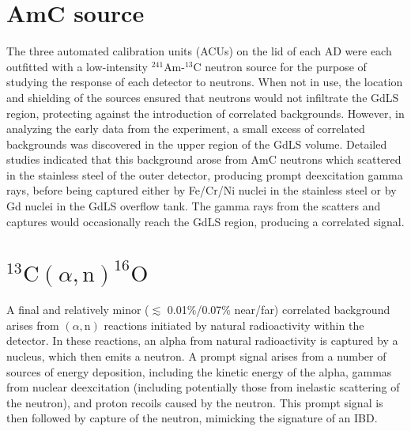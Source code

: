 \documentclass[../thesis.tex]{subfiles}
\begin{document}
\section{AmC source}

The three automated calibration units (ACUs) on the lid of each AD were each outfitted with a low-intensity $^{241}$Am-$^{13}$C neutron source for the purpose of studying the response of each detector to neutrons. When not in use, the location and shielding of the sources ensured that neutrons would not infiltrate the GdLS region, protecting against the introduction of correlated backgrounds. However, in analyzing the early data from the experiment, a small excess of correlated backgrounds was discovered in the upper region of the GdLS volume. Detailed studies indicated that this background arose from AmC neutrons which scattered in the stainless steel of the outer detector, producing prompt deexcitation gamma rays, before being captured either by Fe/Cr/Ni nuclei in the stainless steel or by Gd nuclei in the GdLS overflow tank. The gamma rays from the scatters and captures would occasionally reach the GdLS region, producing a correlated signal.

\newcommand\alphN{(\alpha,\mathrm{n})}
\newcommand\CanO{^{13}\mathrm{C}(\alpha, \mathrm{n})^{16}\mathrm{O}}

\section{$\CanO$}

A final and relatively minor ($\lesssim$ 0.01\%/0.07\% near/far) correlated background arises from $\alphN$ reactions initiated by natural radioactivity within the detector. In these reactions, an alpha from natural radioactivity is captured by a nucleus, which then emits a neutron. A prompt signal arises from a number of sources of energy deposition, including the kinetic energy of the alpha, gammas from nuclear deexcitation (including potentially those from inelastic scattering of the neutron), and proton recoils caused by the neutron. This prompt signal is then followed by capture of the neutron, mimicking the signature of an IBD.
\end{document}
